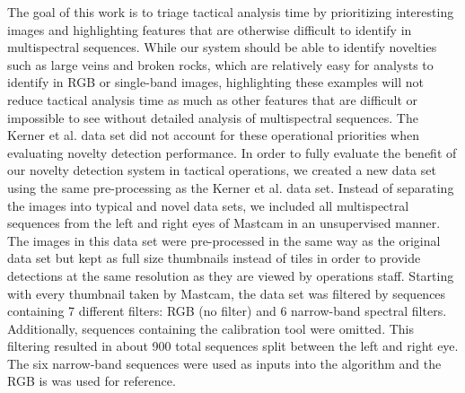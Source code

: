 The goal of this work is to triage tactical analysis time by prioritizing interesting images and highlighting features that are otherwise difficult to identify in multispectral sequences.
While our system should be able to identify novelties such as large veins and broken rocks, which are relatively easy for analysts to identify in RGB or single-band images, highlighting these examples will not reduce tactical analysis time as much as other features that are difficult or impossible to see without detailed analysis of multispectral sequences. 
The Kerner et al. \cite{kerner2020comparison} data set did not account for these operational priorities when evaluating novelty detection performance. 
In order to fully evaluate the benefit of our novelty detection system in tactical operations, we created a new data set using the same pre-processing as the Kerner et al. data set. 
Instead of separating the images into typical and novel data sets, we included all multispectral sequences from the left and right eyes of Mastcam in an unsupervised manner.
The images in this data set were pre-processed in the same way as the original data set but kept as full size thumbnails instead of tiles in order to provide detections at the same resolution as they are viewed by operations staff. 
Starting with every thumbnail taken by Mastcam, the data set was filtered by sequences containing 7 different filters: RGB (no filter) and 6 narrow-band spectral filters.
Additionally, sequences containing the calibration tool were omitted. 
This filtering resulted in about 900 total sequences split between the left and right eye. 
The six narrow-band sequences were used as inputs into the algorithm and the RGB is was used for reference.
